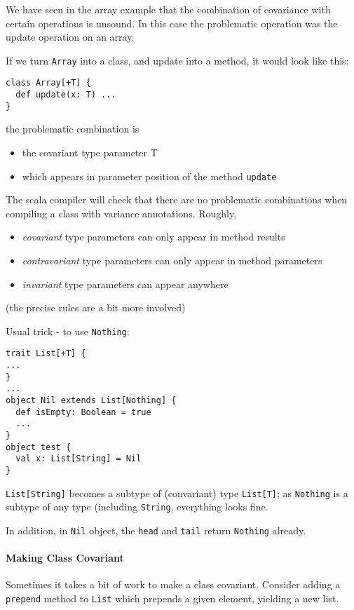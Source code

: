 \documentclass{scrartcl}
\begin{document}
We have seen in the array example that the combination of covariance with
certain operations is unsound. In this case the problematic operation was the
update operation on an array.

If we turn \lstinline|Array| into a class, and update into a method, it would
look like this:
\begin{lstlisting}
class Array[+T] {
  def update(x: T) ...
}
\end{lstlisting}
the problematic combination is
\begin{itemize}
\item the covariant type parameter T
\item which appears in parameter position of the method \lstinline|update| 
\end{itemize}

The scala compiler will check that there are no problematic combinations when
compiling a class with variance annotations. Roughly, 
\begin{itemize}
\item {\it covariant} type parameters can only appear in method results 
\item {\it contravariant} type parameters can only appear in method parameters
\item {\it invariant} type parameters can appear anywhere
\end{itemize}
(the precise rules are a bit more involved)

Usual trick - to use \lstinline|Nothing|:
\begin{lstlisting}
trait List[+T] {
...
}
...
object Nil extends List[Nothing] {
  def isEmpty: Boolean = true
  ...
}
object test {
  val x: List[String] = Nil
}
\end{lstlisting}
\lstinline|List[String]| becomes a subtype of (convariant) type
\lstinline|List[T]|; as \lstinline|Nothing| is a subtype of any type (including
\lstinline|String|, everything looks fine.

In addition, in \lstinline|Nil| object, the \lstinline|head| and
\lstinline|tail| return \lstinline|Nothing| already.

\paragraph{Making Class Covariant}

Sometimes it takes a bit of work to make a class covariant. Consider adding a
\lstinline|prepend| method to \lstinline|List| which prepends a given element,
yielding a new list.
\end{document}
